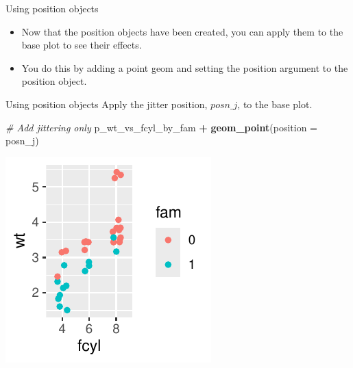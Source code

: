 \documentclass[
  ignorenonframetext,
]{beamer}
\newenvironment{Shaded}{\begin{snugshade}}{\end{snugshade}}
\newcommand{\AttributeTok}[1]{\textcolor[rgb]{0.13,0.29,0.53}{#1}}
\newcommand{\CommentTok}[1]{\textcolor[rgb]{0.56,0.35,0.01}{\textit{#1}}}
\newcommand{\FunctionTok}[1]{\textcolor[rgb]{0.13,0.29,0.53}{\textbf{#1}}}
\newcommand{\NormalTok}[1]{#1}
\newcommand{\SpecialCharTok}[1]{\textcolor[rgb]{0.81,0.36,0.00}{\textbf{#1}}}
\begin{document}
\begin{frame}{Using position objects}
\label{using-position-objects}
\begin{itemize}
\item
  Now that the position objects have been created, you can apply them to
  the base plot to see their effects.
\item
  You do this by adding a point geom and setting the position argument
  to the position object.
\end{itemize}
\end{frame}

\begin{frame}[fragile]{Using position objects}
\label{using-position-objects-1}
Apply the jitter position, \(posn\_j\), to the base plot.


\begin{Shaded}
\begin{Highlighting}[]
\CommentTok{\# Add jittering only}
\NormalTok{p\_wt\_vs\_fcyl\_by\_fam }\SpecialCharTok{+} \FunctionTok{geom\_point}\NormalTok{(}\AttributeTok{position =}\NormalTok{ posn\_j)}
\end{Highlighting}
\end{Shaded}

\begin{center}\includegraphics[width=0.5\linewidth]{Figs/unnamed-chunk-30-1} \end{center}
\end{frame}
\end{document}
